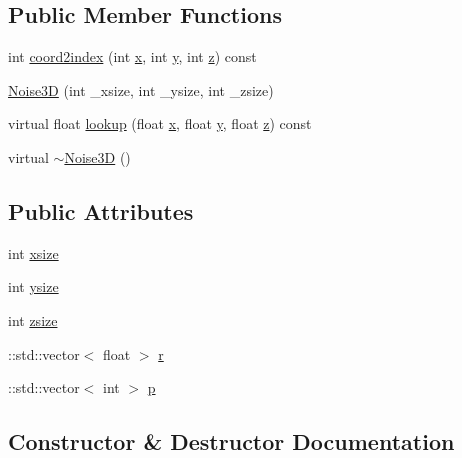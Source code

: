\subsection*{Public Member Functions}
\begin{DoxyCompactItemize}
\item 
int \hyperlink{classtrimesh_1_1Noise3D_ad6ad1c6b70d61c7287aeeaaf62776289}{coord2index} (int \hyperlink{namespacetrimesh_a3365d1b1a1bc5d8e9c844cf589a8c4a8}{x}, int \hyperlink{namespacetrimesh_a56b35d0eb7039be92fcc4867080c7419}{y}, int \hyperlink{namespacetrimesh_a42d0d86cc8db1d2be48121fe5e52fc67}{z}) const
\item 
\hyperlink{classtrimesh_1_1Noise3D_ab5baf8c523393a13e6b01af47263bbba}{Noise3D} (int \+\_\+xsize, int \+\_\+ysize, int \+\_\+zsize)
\item 
virtual float \hyperlink{classtrimesh_1_1Noise3D_a0e2a7259015f580e55b2d171986f0324}{lookup} (float \hyperlink{namespacetrimesh_a3365d1b1a1bc5d8e9c844cf589a8c4a8}{x}, float \hyperlink{namespacetrimesh_a56b35d0eb7039be92fcc4867080c7419}{y}, float \hyperlink{namespacetrimesh_a42d0d86cc8db1d2be48121fe5e52fc67}{z}) const
\item 
virtual \hyperlink{classtrimesh_1_1Noise3D_aef78d10b7449d4f3ec2f42d2b339e1cb}{$\sim$\+Noise3D} ()
\end{DoxyCompactItemize}
\subsection*{Public Attributes}
\begin{DoxyCompactItemize}
\item 
int \hyperlink{classtrimesh_1_1Noise3D_ac341c7ec5a42933deecb9d0b7e87d8b5}{xsize}
\item 
int \hyperlink{classtrimesh_1_1Noise3D_ab3f074a621d845415b630b2557b2abe8}{ysize}
\item 
int \hyperlink{classtrimesh_1_1Noise3D_a4086f2c7e2bca05060da451dfea9ac89}{zsize}
\item 
\+::std\+::vector$<$ float $>$ \hyperlink{classtrimesh_1_1Noise3D_a7f5ac7d58acaeec3679916dcb371764f}{r}
\item 
\+::std\+::vector$<$ int $>$ \hyperlink{classtrimesh_1_1Noise3D_aac0d726dd1f44ae92e64b69b04815ea2}{p}
\end{DoxyCompactItemize}


\subsection{Constructor \& Destructor Documentation}
\mbox{\label{classtrimesh_1_1Noise3D_ab5baf8c523393a13e6b01af47263bbba}} 
